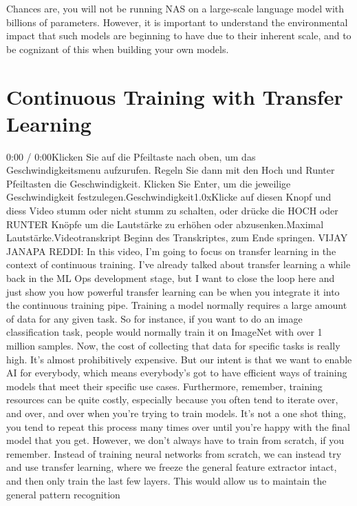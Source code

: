 {{{{    Chances are, you will not be running NAS on a large-scale language model with billions of parameters. However, it is important to understand the environmental impact that such models are beginning to have due to their inherent scale, and to be cognizant of this when building your own models.

\section{Continuous Training with Transfer Learning}

    0:00 / 0:00Klicken Sie auf die Pfeiltaste nach oben, um das Geschwindigkeitsmenu aufzurufen. Regeln Sie dann mit den Hoch und Runter Pfeiltasten die Geschwindigkeit. Klicken Sie Enter, um die jeweilige Geschwindigkeit festzulegen.Geschwindigkeit1.0xKlicke auf diesen Knopf und diess Video stumm oder nicht stumm zu schalten, oder drücke die HOCH oder RUNTER Knöpfe um die Lautstärke zu erhöhen oder abzusenken.Maximal Lautstärke.Videotranskript
    Beginn des Transkriptes, zum Ende springen.
    VIJAY JANAPA REDDI: In this video, I'm going
    to focus on transfer learning in the context of continuous training.
    I've already talked about transfer learning a while back
    in the ML Ops development stage, but I want
    to close the loop here and just show you how powerful transfer learning can
    be when you integrate it into the continuous training pipe.
    Training a model normally requires a large amount
    of data for any given task.
    So for instance, if you want to do an image classification task,
    people would normally train it on ImageNet with over 1 million samples.
    Now, the cost of collecting that data for specific tasks is really high.
    It's almost prohibitively expensive.
    But our intent is that we want to enable AI for everybody, which
    means everybody's got to have efficient ways of training models
    that meet their specific use cases.
    Furthermore, remember, training resources
    can be quite costly, especially because you often tend to iterate over,
    and over, and over when you're trying to train models.
    It's not a one shot thing, you tend to repeat this process
    many times over until you're happy with the final model that you get.
    However, we don't always have to train from scratch, if you remember.
    Instead of training neural networks from scratch,
    we can instead try and use transfer learning, where
    we freeze the general feature extractor intact,
    and then only train the last few layers.
    This would allow us to maintain the general pattern recognition
}}}}
